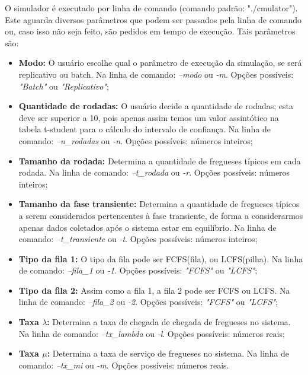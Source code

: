 \documentclass[a4paper,10pt]{article}
\begin{document}
    O simulador é executado por linha de comando (comando padrão: "./cmulator"). Este aguarda diversos parâmetros que podem ser passados pela linha de comando ou, caso isso não seja feito, são pedidos em tempo de execução. Tais parâmetros são:

\begin {itemize}
\item \textbf{Modo:} O usuário escolhe qual o parâmetro de execução da simulação, se será replicativo ou batch. Na linha de comando: \emph{--modo} ou \emph{-m}. Opções possíveis: \emph{"Batch"} ou \emph{"Replicativo"};

\item \textbf{Quantidade de rodadas:} O usuário decide a quantidade de rodadas; esta deve ser superior a 10, pois apenas assim temos um valor assintótico na tabela t-student para o cálculo do intervalo de confiança. Na linha de comando: \emph{--n\_rodadas} ou \emph{-n}. Opções possíveis: números inteiros;

\item \textbf{Tamanho da rodada:} Determina a quantidade de fregueses típicos em cada rodada. Na linha de comando: \emph{--t\_rodada} ou \emph{-r}. Opções possíveis: números inteiros;

\item \textbf{Tamanho da fase transiente:} Determina a quantidade de fregueses típicos a serem considerados pertencentes à fase transiente, de forma a considerarmos apenas dados coletados após o sistema estar em equilíbrio. Na linha de comando: \emph{--t\_transiente} ou \emph{-t}. Opções possíveis: números inteiros;

\item \textbf{Tipo da fila 1:} O tipo da fila pode ser FCFS(fila), ou LCFS(pilha). Na linha de comando: \emph{--fila\_1} ou \emph{-1}. Opções possíveis: \emph{"FCFS"} ou \emph{"LCFS"};

\item \textbf{Tipo da fila 2:} Assim como a fila 1, a fila 2 pode ser FCFS ou LCFS. Na linha de comando: \emph{--fila\_2} ou \emph{-2}. Opções possíveis: \emph{"FCFS"} ou \emph{"LCFS"};

\item \textbf{Taxa $\lambda$:} Determina a taxa de chegada de chegada de fregueses no sistema. Na linha de comando: \emph{--tx\_lambda} ou \emph{-l}. Opções possíveis: números reais;

\item \textbf{Taxa $\mu$:} Determina a taxa de serviço de fregueses no sistema. Na linha de comando: \emph{--tx\_mi} ou \emph{-m}. Opções possíveis: números reais.
\end {itemize}
\end{document}
